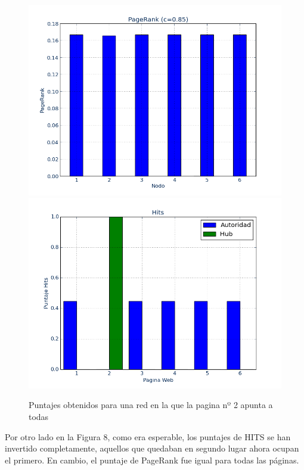 \documentclass[a4paper]{article}
\begin{document}
\begin{figure}[htbp]
\centering
\includegraphics[scale=0.385]{img/eldosatodos.png}
\includegraphics[scale=0.385]{img/eldosatodosH.png}
\caption{Puntajes obtenidos para una red en la que la pagina nº 2 apunta a todas}
\end{figure}

Por otro lado en la Figura 8, como era esperable, los puntajes de HITS se han invertido completamente, aquellos que quedaban en segundo lugar ahora ocupan el primero. En cambio, el puntaje de PageRank fue igual para todas las páginas.
\end{document}
